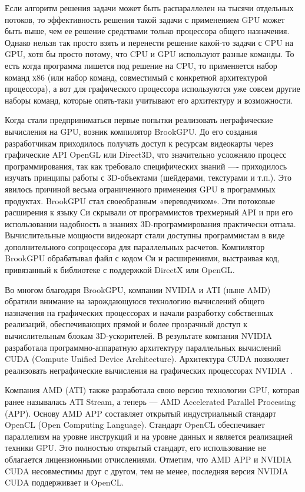Если алгоритм решения задачи может быть распараллелен на тысячи отдельных потоков, то эффективность решения такой задачи с применением GPU может быть выше, чем ее решение средствами только процессора общего назначения. Однако нельзя так просто взять и перенести решение какой-то задачи с CPU на GPU, хотя бы просто потому, что CPU и GPU используют разные команды. То есть когда программа пишется под решение на CPU, то применяется набор команд х86 (или набор команд, совместимый с конкретной архитектурой процессора), а вот для графического процессора используются уже совсем другие наборы команд, которые опять-таки учитывают его архитектуру и возможности. 

Когда стали предприниматься первые попытки реализовать неграфические вычисления на GPU, возник компилятор BrookGPU. До его создания разработчикам приходилось получать доступ к ресурсам видеокарты через графические API OpenGL или Direct3D, что значительно усложняло процесс программирования, так как требовало специфических знаний ---- приходилось изучать принципы работы с 3D-объектами (шейдерами, текстурами и т.п.). Это явилось причиной весьма ограниченного применения GPU в программных продуктах. BrookGPU стал своеобразным «переводчиком». Эти потоковые расширения к языку Си скрывали от программистов трехмерный API и при его использовании надобность в знаниях 3D-программирования практически отпала. Вычислительные мощности видеокарт стали доступны программистам в виде дополнительного сопроцессора для параллельных расчетов. Компилятор BrookGPU обрабатывал файл с кодом Cи и расширениями, выстраивая код, привязанный к библиотеке с поддержкой DirectX или OpenGL.

Во многом благодаря BrookGPU, компании NVIDIA и ATI (ныне AMD) обратили внимание на зарождающуюся технологию вычислений общего назначения на графических процессорах и начали разработку собственных реализаций, обеспечивающих прямой и более прозрачный доступ к вычислительным блокам 3D-ускорителей.
В результате компания NVIDIA разработала программно-аппаратную архитектуру параллельных вычислений CUDA (Compute Unified Device Architecture). Архитектура CUDA позволяет реализовать неграфические вычисления на графических процессорах NVIDIA~\cite{gpu_2012}.

Компания AMD (ATI) также разработала свою версию технологии GPU, которая ранее называлась AТI Stream, а теперь — AMD Accelerated Parallel Processing (APP). Основу AMD APP составляет открытый индустриальный стандарт OpenCL (Open Computing Language). Стандарт OpenCL обеспечивает параллелизм на уровне инструкций и на уровне данных и является реализацией техники GPU. Это полностью открытый стандарт, его использование не облагается лицензионными отчислениями. Отметим, что AMD APP и NVIDIA CUDA несовместимы друг с другом, тем не менее, последняя версия NVIDIA CUDA поддерживает и OpenCL.

